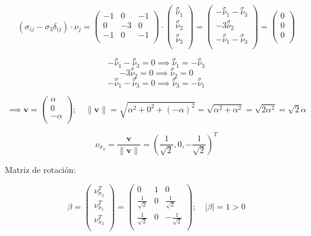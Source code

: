 \documentclass[a4paper,12pt,twoside,final,spanish]{article}
\begin{document}
\[
(\sigma_{ij}-\sigma_{3}\delta_{ij})\cdot\nu_{j}=
\left(\begin{matrix}
-1 & 0 & -1 \\
0 & -3 & 0 \\
-1 & 0 & -1 \\
\end{matrix}\right)\cdot
\left(\begin{matrix}
\stackrel \sigma \nu_{1} \\
\stackrel \sigma \nu_{2} \\
\stackrel \sigma \nu_{3} \\
\end{matrix}\right)
=
\left(\begin{matrix}
-\stackrel \sigma \nu_{1}-\stackrel \sigma \nu_{3} \\
-3\stackrel \sigma \nu_{2} \\
-\stackrel \sigma \nu_{1}-\stackrel \sigma \nu_{3} \\
\end{matrix}\right)
=
\left(\begin{matrix}
0 \\
0 \\
0 \\
\end{matrix}\right)
\]

\[
-\stackrel \sigma \nu_{1}-\stackrel \sigma \nu_{3}=0
\implies \stackrel \sigma \nu_{1}=-\stackrel \sigma \nu_{3}
\]
\[
-3\stackrel \sigma \nu_{2}=0
\implies \stackrel \sigma \nu_{2}=0
\]
\[
-\stackrel \sigma \nu_{1}-\stackrel \sigma \nu_{3}=0
\implies \stackrel \sigma \nu_{3}=-\stackrel \sigma \nu_{1}
\]

\[
\implies
\mathbf{v}=\left(\begin{matrix}
\alpha \\
0 \\
-\alpha \\
\end{matrix}\right);\quad
\|\mathbf{v}\|
=\sqrt{\alpha^2+0^2+(-\alpha)^2}=\sqrt{\alpha^2+\alpha^2}=\sqrt{2\alpha^2}=\sqrt{2}\alpha
\]

\[
\nu_{\sigma_{3}}=\frac{\mathbf{v}}{\|\mathbf{v}\|}
=
\left(\frac{1}{\sqrt{2}},0,-\frac{1}{\sqrt{2}}\right)^{T}
\]

Matriz de rotación:

\[
\beta=
\left(\begin{matrix}
\nu_{\sigma_{2}}^{T} \\
\nu_{\sigma_{1}}^{T} \\
\nu_{\sigma_{3}}^{T} \\
\end{matrix}\right)
=
\left(\begin{matrix}
0 & 1 & 0 \\
\frac{1}{\sqrt{2}} & 0 & \frac{1}{\sqrt{2}} \\
\frac{1}{\sqrt{2}} & 0 & -\frac{1}{\sqrt{2}} \\
\end{matrix}\right);\quad
|\beta|=1>0
\]
\end{document}
